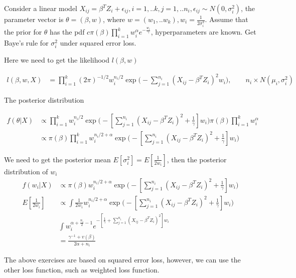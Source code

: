 \begin{Example}
Consider a linear model $X_{ij} = \beta^T Z_i + \epsilon_{ij}, i= 1,..k, j= 1,.. n_i, \epsilon_{ij} \sim N(0, \sigma^2_i)$, the parameter vector is $\theta = (\beta, w)$, where $w= (w_1,.. w_k), w_i = \frac{1}{2 \sigma_i^2}$. 
Assume that the prior for $\theta$ has the pdf $c \pi(\beta) \prod_{i=1}^k w_i^{\alpha} e^{-\frac{w_i}{\gamma}}$, hyperparameters are known. Get Baye's rule for $\sigma_i^2$ under squared error loss.

Here we need to get the likelihood $l(\beta, w)$

 \begin{align*}
l(\beta, w, X) &= \prod_{i=1}^k (2\pi)^{-1/2} w_i^{n_i/2} \exp \Big(- \sum_{j=1}^{n_i}(X_{ij}- \beta^T Z_{i})^2 w_i \Big) ,\qquad n_i \times N(\mu_i, \sigma_i^2) 
\end{align*}

The posterior distribution

 \begin{align*}
f(\theta | X) & \propto \prod_{i=1}^k w_i^{n_i /2} \exp \Big(- [\sum_{j=1}^{n_i} (X_{ij}- \beta^T Z_i)^2 + \frac{1}{\gamma} ]w_i \Big) \pi(\beta) \prod_{i=1}^k w_i^{\alpha} \\
& \propto \pi(\beta) \prod_{i=1}^k w_i^{n_i /2 + \alpha} \exp \Big(- [\sum_{j=1}^{n_i }(X_{ij}- \beta^T Z_i)^2 + \frac{1}{\gamma} ]w_i \Big) 
\end{align*}

We need to get the posterior mean $E[\sigma_i^2] = E[\frac{1}{2 w_i}]$, then the posterior distribution of $w_i$ 
 \begin{align*}
f(w_i | X) & \propto \pi(\beta)  w_i^{n_i /2 + \alpha} \exp \Big(- [\sum_{j=1}^{n_i} (X_{ij}- \beta^T Z_i)^2 + \frac{1}{\gamma} ]w_i \Big) \\
E[\frac{1}{2 w_i}] & \propto \int \frac{1}{2 w_i} w_i^{n_i /2 + \alpha} \exp \Big(- [\sum_{j=1}^{n_i} (X_{ij}- \beta^T Z_i)^2 + \frac{1}{\gamma} ]w_i \Big) \\
& \int w_i^{\alpha + \frac{n_i}{2} -1} e^{-[\frac{1}{\gamma} + \sum_{j=1}^{n_i }(X_{ij}- \beta^T Z_i)^2 ] w_i } \\
&= \frac{\gamma^{-1} + v(\beta)}{2 \alpha + n_i}
\end{align*}

\end{Example}

The above exercises are based on squared error loss, however, we can use the other loss function, such as weighted loss function.

